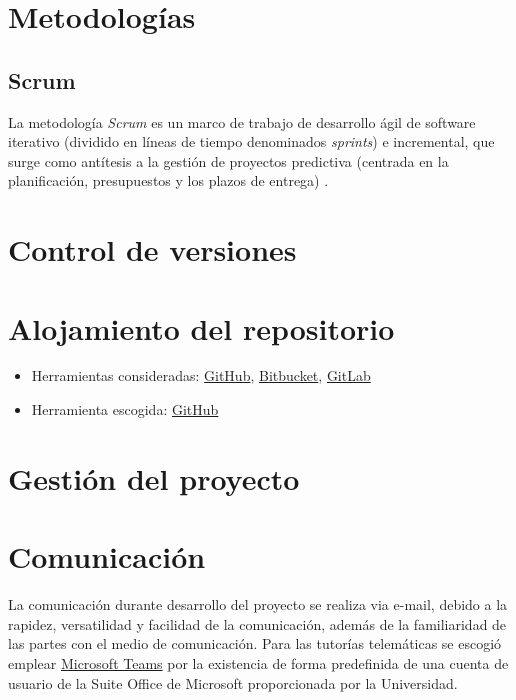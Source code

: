 
\section{Metodologías}
\subsection{Scrum}
La metodología \textit{Scrum} es un marco de trabajo de desarrollo ágil de software
iterativo (dividido en líneas de tiempo denominados \textit{sprints}) e incremental, 
que surge como antítesis a la gestión de proyectos predictiva (centrada en la planificación,
presupuestos y los plazos de entrega) \cite{enwiki:scrum2023,book:palacio2021}.

\section{Control de versiones}

\section{Alojamiento del repositorio}
\begin{itemize}
    \item Herramientas consideradas: \href{https://github.com/}{GitHub}, 
        \href{https://bitbucket.org/product/es/}{Bitbucket},
        \href{https://about.gitlab.com/}{GitLab}
    \item Herramienta escogida: \href{https://github.com/}{GitHub}
\end{itemize}

\section{Gestión del proyecto}

\section{Comunicación}
La comunicación durante desarrollo del proyecto se realiza via e-mail, debido a la rapidez,
versatilidad y facilidad de la comunicación, además de la familiaridad de las partes con el 
medio de comunicación.
Para las tutorías telemáticas se escogió emplear 
\href{https://www.microsoft.com/es-es/microsoft-teams/log-in}{Microsoft Teams} por la existencia 
de forma predefinida de una cuenta de usuario de la Suite Office de Microsoft proporcionada
por la Universidad.


